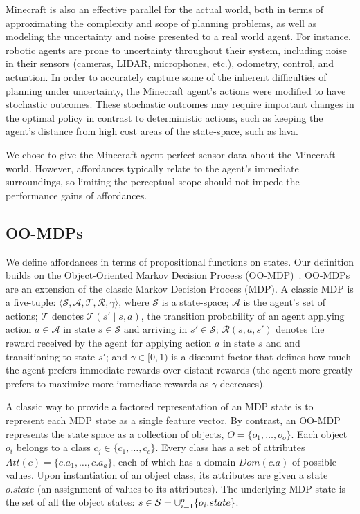 \documentclass[conference]{IEEEtran}
\begin{document}
Minecraft is also an effective parallel for the actual world, both
in terms of approximating the complexity and scope of planning
problems, as well as modeling the uncertainty and noise presented to a
real world agent.  For instance, robotic agents are prone to
uncertainty throughout their system, including noise in their
sensors (cameras, LIDAR, microphones, etc.), odometry, control, and
actuation.  In order to accurately capture some of the inherent
difficulties of planning under uncertainty, the Minecraft agent's
actions were modified to have stochastic outcomes. These stochastic
outcomes may require important changes in the optimal policy in
contrast to deterministic actions, such as keeping the agent's
distance from high cost areas of the state-space, such as lava. 

We chose to give the Minecraft agent perfect sensor data about the Minecraft world.
However, affordances typically relate to the agent's immediate surroundings,
so limiting the perceptual scope should not impede the performance gains of affordances.

\subsection{OO-MDPs}
We define affordances in terms of propositional functions on states. Our definition builds on the Object-Oriented Markov Decision Process
(OO-MDP)~\citep{diuk08}.  OO-MDPs are an extension of
the classic Markov Decision Process (MDP).  A classic MDP is a
five-tuple: $\langle \mathcal{S}, \mathcal{A}, \mathcal{T},
\mathcal{R}, \gamma \rangle$, where $\mathcal{S}$ is a state-space;
$\mathcal{A}$ is the agent's set of actions; $\mathcal{T}$ denotes
$\mathcal{T}(s' \mid s,a)$, the transition probability of an agent
applying action $a \in \mathcal{A}$ in state $s \in \mathcal{S}$ and
arriving in $s' \in \mathcal{S}$; $\mathcal{R}(s,a,s')$ denotes the
reward received by the agent for applying action $a$ in state $s$ and
and transitioning to state $s'$; and $\gamma \in [0, 1)$ is a discount
  factor that defines how much the agent prefers immediate rewards
  over distant rewards (the agent more greatly prefers to maximize
  more immediate rewards as $\gamma$ decreases).

A classic way to provide a factored representation of an MDP state is to represent
each MDP state as a single feature vector. By contrast, an OO-MDP represents the state space as a collection of objects,
$O = \{o_1, \ldots, o_o \}$.  Each object $o_i$ belongs to a
class $c_j \in  \{c_1, \ldots, c_c\}$. Every class has a set of attributes
$Att(c) = \{c.a_1, \ldots, c.a_a \}$, each of which has a domain $Dom(c.a)$ of possible values.
Upon instantiation of an object class, its attributes are given a state $o.state$
(an assignment of values to its attributes).  The underlying MDP state is the set
of all the object states: $s \in {\cal S} = \cup_{i = 1}^o \{o_i.state\}$. 
\end{document}
